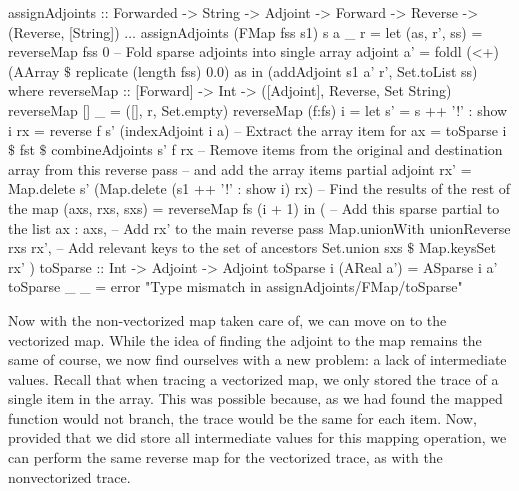             \begin{haskell}[caption=Implementation of \texttt{assignAdjoints} for the map operation, label=lst:assign_map, gobble=16]
                assignAdjoints :: Forwarded -> String -> Adjoint -> Forward -> Reverse
                    -> (Reverse, [String])
                $\dots$
                assignAdjoints (FMap fss s1) s a _ r =
                    let (as, r', ss) = reverseMap fss 0
                        -- Fold sparse adjoints into single array adjoint
                        a' = foldl (<+) (AArray $\$$ replicate (length fss) 0.0) as
                    in  (addAdjoint s1 a' r', Set.toList ss)
                    where
                        reverseMap :: [Forward] -> Int -> ([Adjoint], Reverse, Set String)
                        reverseMap []     _ = ([], r, Set.empty)
                        reverseMap (f:fs) i =
                            let s'  = s ++ '!' : show i
                                rx  = reverse f s' (indexAdjoint i a)
                                -- Extract the array item for 
                                ax  = toSparse i $\$$ fst $\$$ combineAdjoints s' f rx
                                -- Remove items from the original and destination array from this reverse pass
                                -- and add the array items partial adjoint
                                rx' = Map.delete s' (Map.delete (s1 ++ '!' : show i) rx)
                                -- Find the results of the rest of the map
                                (axs, rxs, sxs) = reverseMap fs (i + 1)
                            in  (
                                -- Add this sparse partial to the list
                                ax : axs,
                                -- Add rx' to the main reverse pass
                                Map.unionWith unionReverse rxs rx',
                                -- Add relevant keys to the set of ancestors
                                Set.union sxs $\$$ Map.keysSet rx'
                            )
                        toSparse :: Int -> Adjoint -> Adjoint
                        toSparse i (AReal a') = ASparse i a'
                        toSparse _ _          =
                            error "Type mismatch in assignAdjoints/FMap/toSparse"
            \end{haskell}

            Now with the non-vectorized map taken care of, we can move on to the vectorized map.
            While the idea of finding the adjoint to the map remains the same of course, we now find ourselves with a new problem: a lack of intermediate values.
            Recall that when tracing a vectorized map, we only stored the trace of a single item in the array.
            This was possible because, as we had found the mapped function would not branch, the trace would be the same for each item.
            Now, provided that we did store all intermediate values for this mapping operation, we can perform the same reverse map for the vectorized trace, as with the nonvectorized trace.

